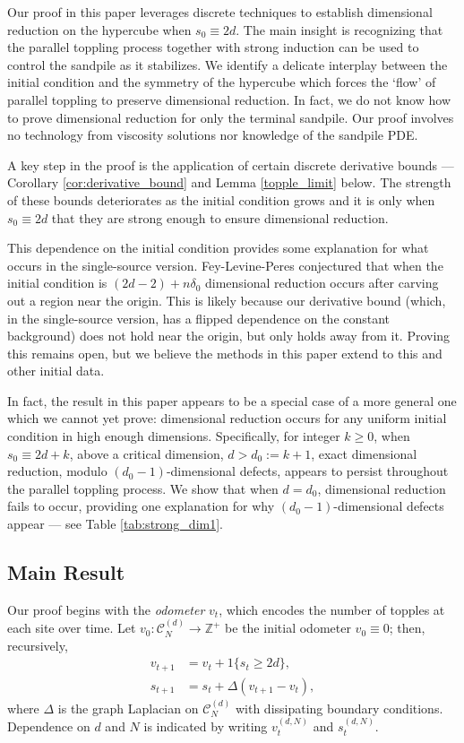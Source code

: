 \documentclass[12pt]{amsart}
\begin{document}
	Our proof in this paper leverages discrete techniques to establish dimensional reduction on the hypercube when $s_0 \equiv 2d$. The main insight is recognizing that the parallel toppling process together with strong induction can be used to control the sandpile as it stabilizes.  We identify a delicate interplay between the initial condition and the symmetry of the hypercube which forces the `flow' of parallel toppling to preserve dimensional reduction. In fact, we do not know how to prove dimensional reduction for only the terminal sandpile. Our proof involves no technology from viscosity solutions nor knowledge of the sandpile PDE.
	
	A key step in the proof is the application of certain discrete derivative bounds  --- Corollary \ref{cor:derivative_bound} and Lemma \ref{topple_limit} below. The strength of these bounds deteriorates as the initial condition grows and it is only when $s_0 \equiv 2d$ that they are strong enough to ensure dimensional reduction. 
	
	This dependence on the initial condition provides some explanation for what occurs in the single-source version. Fey-Levine-Peres conjectured 
	that when 	the initial condition is $(2 d- 2 ) + n \delta_0$  dimensional reduction occurs after carving out a region near the origin. This is likely because 
	our derivative bound (which, in the single-source version, has a flipped dependence on the constant background) does not hold near the origin, but only holds away from it.  Proving this remains open, but we believe the methods in this paper extend to 
	this and other initial data. 
	
	In fact, the result in this paper appears to be a special case of a more general one which we cannot yet prove: dimensional reduction occurs for any uniform initial condition 
	in high enough dimensions. Specifically, for integer $k \geq 0$, when $s_0 \equiv 2d + k$, above a critical dimension, $d > d_0 := k+1$, exact dimensional reduction, modulo $(d_0-1)$-dimensional defects, appears to persist throughout the parallel toppling process. We show that when $d = d_0$, dimensional reduction fails to occur, providing one explanation for why $(d_0-1)$-dimensional defects appear --- see Table \ref{tab:strong_dim1}. 
	

	
	\subsection{Main Result} \label{subsec:main_result}
	Our proof begins with the {\it odometer} $v_t$, which encodes the number of topples at each site over time. Let $v_0 : \mathcal{C}_N^{(d)} \to \mathbb{Z}^+$ be the initial odometer $v_0 \equiv 0$; then, recursively, 
	\begin{align}
	v_{t+1} &= v_{t} +  1\{ s_{t} \geq 2 d \}, \\
	s_{t+1} &= s_{t} + \Delta ( v_{t+1} - v_{t} ) ,
	\end{align}
	where $\Delta$ is the graph Laplacian on $\mathcal{C}_N^{(d)}$ with dissipating boundary conditions.  Dependence on $d$ and $N$ is indicated by writing $v_t^{(d,N)}$ and $s_t^{(d,N)}$. %
	
\end{document}
